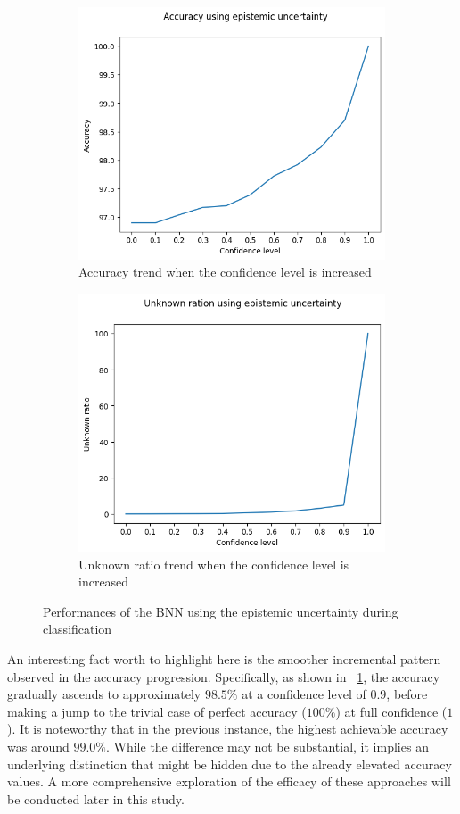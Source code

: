 \begin{figure}[h]
	\centering
	\begin{subfigure}{.5\textwidth}
		\centering
		\includegraphics[width=0.8\linewidth]{ImageFiles/ClassifUncer/epistemic_acc}
		\caption{Accuracy trend when the confidence level is increased}
		\label{fig:epistemic_acc}
	\end{subfigure}%
	\begin{subfigure}{.5\textwidth}
		\centering
		\includegraphics[width=0.8\linewidth]{ImageFiles/ClassifUncer/epistemic_unk}
		\caption{Unknown ratio trend when the confidence level is increased}
		\label{fig:epistemic_unk}
	\end{subfigure}
	\caption{Performances of the BNN using the epistemic uncertainty during classification}
	\label{fig:epistemic_class}
\end{figure}


An interesting fact worth to highlight here is the smoother incremental pattern observed in the accuracy progression. Specifically, as shown in \Fig~\ref{fig:epistemic_acc}, the accuracy gradually ascends to approximately $98.5\%$ at a confidence level of $0.9$, before making a jump to the trivial case of perfect accuracy ($100\%$) at full confidence ($1$). It is noteworthy that in the previous instance, the highest achievable accuracy was around $99.0\%$. While the difference may not be substantial, it implies an underlying distinction that might be hidden due to the already elevated accuracy values. A more comprehensive exploration of the efficacy of these approaches will be conducted later in this study.